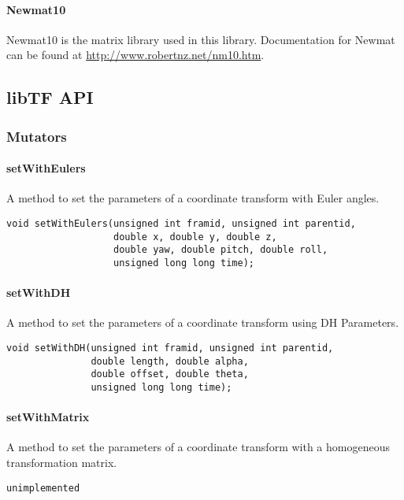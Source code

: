 \documentclass[12pt]{article}
\begin{document}
\paragraph {Newmat10}
Newmat10 is the matrix library used in this library.  Documentation for Newmat can be found at 
\url{http://www.robertnz.net/nm10.htm}.  

\subsection{libTF API}
\subsubsection{Mutators}

\paragraph{setWithEulers}
A method to set the parameters of a coordinate transform with Euler angles. 
\begin{verbatim}
void setWithEulers(unsigned int framid, unsigned int parentid, 
                   double x, double y, double z, 
                   double yaw, double pitch, double roll, 
                   unsigned long long time);
\end{verbatim}

\paragraph{setWithDH}
A method to set the parameters of a coordinate transform using DH Parameters. 
\begin{verbatim} 
void setWithDH(unsigned int framid, unsigned int parentid, 
               double length, double alpha, 
               double offset, double theta, 
               unsigned long long time);
\end{verbatim}



\paragraph{setWithMatrix}
A method to set the parameters of a coordinate transform with a homogeneous transformation matrix. 
\begin{verbatim}
unimplemented
\end{verbatim}
\end{document}
